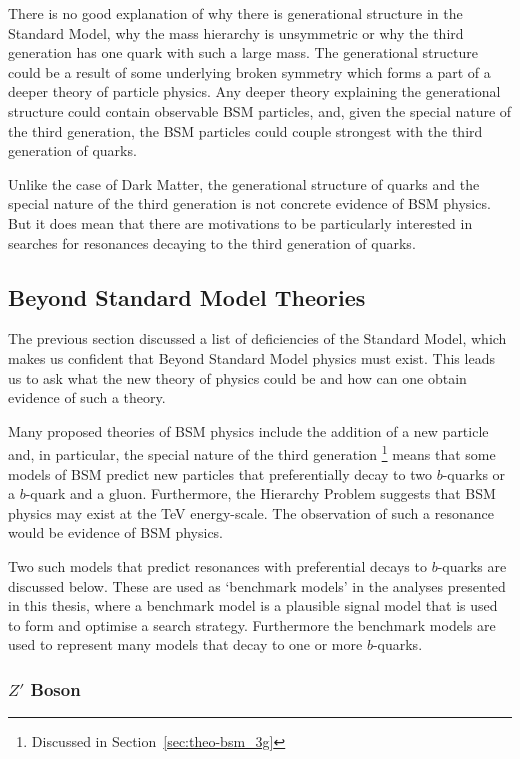 There is no good explanation of why there is generational structure in the Standard Model,
why the mass hierarchy is unsymmetric 
or why the third generation has one quark with such a large mass.
The generational structure could be a result of some underlying broken symmetry
which forms a part of a deeper theory of particle physics.
Any deeper theory explaining the generational structure could contain observable BSM particles,
and, given the special nature of the third generation,
the BSM particles could couple strongest with the third generation of quarks.

Unlike the case of Dark Matter,
the generational structure of quarks
and the special nature of the third generation is not concrete evidence of BSM physics.
But it does mean that there are motivations to be particularly interested in
searches for resonances decaying to the third generation of quarks.

\subsection{Beyond Standard Model Theories}
\label{sec:theo-bsm_models}

The previous section discussed a list of deficiencies of the Standard Model,
which makes us confident that Beyond Standard Model physics must exist.
This leads us to ask what the new theory of physics could be and
how can one obtain evidence of such a theory.

Many proposed theories of BSM physics include the addition of a new particle and,
in particular, the special nature of the third generation
\footnote{Discussed in Section~\ref{sec:theo-bsm_3g}}
means that some models of BSM predict new particles
that preferentially decay to two $b$-quarks or a $b$-quark and a gluon.
Furthermore, the Hierarchy Problem suggests that BSM physics may exist at the TeV energy-scale.
The observation of such a resonance would be evidence of BSM physics.

Two such models that predict resonances with preferential decays to $b$-quarks are discussed below.
These are used as `benchmark models' in the analyses presented in this thesis,
where a benchmark model is a plausible signal model that is used to form and optimise a search strategy.
Furthermore the benchmark models are used to represent many models that decay to one or more $b$-quarks.

\subsubsection{$Z'$ Boson}
\label{sec:theo-bsm_zprime}

